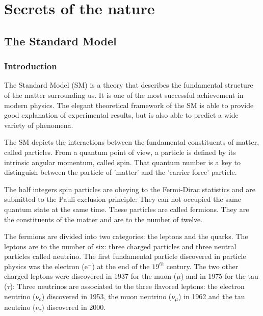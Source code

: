 \chapter{Secrets of the nature}

 \minitoc
  \section{The Standard Model}

    \subsection{Introduction}
    
    The Standard Model (SM) is a theory that describes the fundamental structure of the matter surrounding us. 
    It is one of the most successful achievement in modern physics.
    The elegant theoretical framework of the SM is able to provide good explanation of experimental results, but is also able to predict a wide variety of phenomena.

    The SM depicts the interactions between the fundamental constituents of matter, called particles.
    From a quantum point of view, a particle is defined by its intrinsic angular momentum, called spin. 
    That quantum number is a key to distinguish between the particle of 'matter' and the 'carrier force' particle.
    
    The half integers spin particles are obeying to the Fermi-Dirac statistics and are submitted to the Pauli exclusion principle:
    They can not occupied the same quantum state at the same time.
    These particles are called fermions.
    They are the constituents of the matter and are to the number of twelve.

    The fermions are divided into two categories: the leptons and the quarks. 
    The leptons are to the number of six: three charged particles and three neutral particles called neutrino.
    The first fundamental particle discovered in particle physics was the electron (e$^-$) at the end of the $19^{th}$ century.
    The two other charged leptons were discovered in 1937 for the muon ($\mu$) and in 1975 for the tau ($\tau$):
    Three neutrinos are associated to the three flavored leptons: the electron neutrino ($\nu_e$) discovered in 1953, the muon neutrino ($\nu_{\mu}$) in 1962 and the tau neutrino ($\nu_{\tau}$) discovered in 2000.

